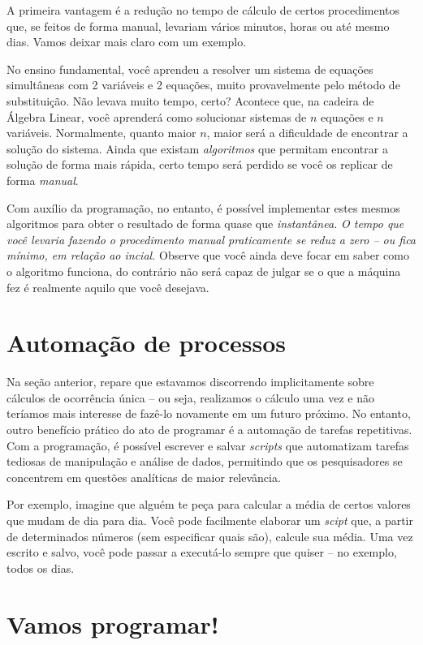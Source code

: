 \documentclass[
  letterpaper,
  DIV=11,
  numbers=noendperiod]{scrreprt}
\begin{document}
A primeira vantagem é a redução no tempo de cálculo de certos
procedimentos que, se feitos de forma manual, levariam vários minutos,
horas ou até mesmo dias. Vamos deixar mais claro com um exemplo.

No ensino fundamental, você aprendeu a resolver um sistema de equações
simultâneas com 2 variáveis e 2 equações, muito provavelmente pelo
método de substituição. Não levava muito tempo, certo? Acontece que, na
cadeira de Álgebra Linear, você aprenderá como solucionar sistemas de
\(n\) equações e \(n\) variáveis. Normalmente, quanto maior \(n\), maior
será a dificuldade de encontrar a solução do sistema. Ainda que existam
\emph{algoritmos} que permitam encontrar a solução de forma mais rápida,
certo tempo será perdido se você os replicar de forma \emph{manual}.

Com auxílio da programação, no entanto, é possível implementar estes
mesmos algoritmos para obter o resultado de forma quase que
\emph{instantânea.} \emph{O tempo que você levaria fazendo o
procedimento manual praticamente se reduz a zero -- ou fica mínimo, em
relação ao incial.} Observe que você ainda deve focar em saber como o
algoritmo funciona, do contrário não será capaz de julgar se o que a
máquina fez é realmente aquilo que você desejava.

\section{Automação de processos}\label{automauxe7uxe3o-de-processos}

Na seção anterior, repare que estavamos discorrendo implicitamente sobre
cálculos de ocorrência única -- ou seja, realizamos o cálculo uma vez e
não teríamos mais interesse de fazê-lo novamente em um futuro próximo.
No entanto, outro benefício prático do ato de programar é a automação de
tarefas repetitivas. Com a programação, é possível escrever e salvar
\emph{scripts} que automatizam tarefas tediosas de manipulação e análise
de dados, permitindo que os pesquisadores se concentrem em questões
analíticas de maior relevância.

Por exemplo, imagine que alguém te peça para calcular a média de certos
valores que mudam de dia para dia. Você pode facilmente elaborar um
\emph{scipt} que, a partir de determinados números (sem especificar
quais são), calcule sua média. Uma vez escrito e salvo, você pode passar
a executá-lo sempre que quiser -- no exemplo, todos os dias.

\section{Vamos programar!}\label{vamos-programar}
\end{document}
